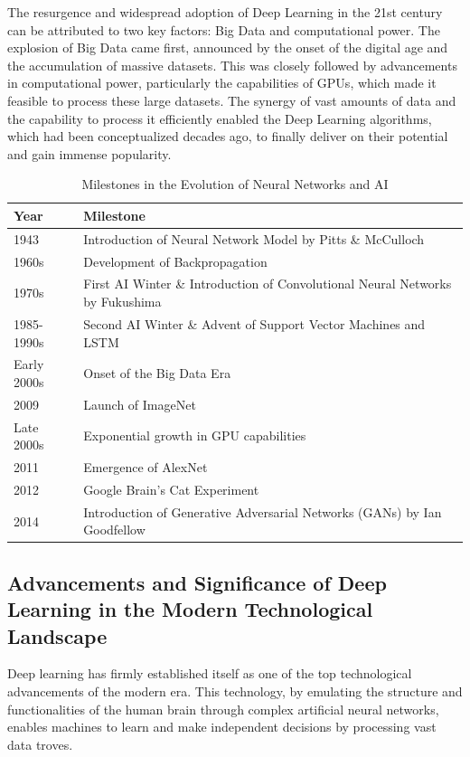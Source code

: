 The resurgence and widespread adoption of Deep Learning in the 21st century can be attributed to two key factors: Big Data and computational power. The explosion of Big Data came first, announced by the onset of the digital age and the accumulation of massive datasets. This was closely followed by advancements in computational power, particularly the capabilities of GPUs, which made it feasible to process these large datasets. The synergy of vast amounts of data and the capability to process it efficiently enabled the Deep Learning algorithms, which had been conceptualized decades ago, to finally deliver on their potential and gain immense popularity.\\

\begin{table}[htbp]
    \centering
    \caption{Milestones in the Evolution of Neural Networks and AI}
    \label{tab:milestones}
    \begin{tabular}{|l|p{\textwidth - 3cm}|}
        \hline
        \textbf{Year} & \textbf{Milestone} \\
        \hline
        1943 & Introduction of Neural Network Model by Pitts \& McCulloch \\
        \hline
        1960s & Development of Backpropagation \\
        \hline
        1970s & First AI Winter \& Introduction of Convolutional Neural Networks by Fukushima \\
        \hline
        1985-1990s & Second AI Winter \& Advent of Support Vector Machines and LSTM \\
        \hline
        Early 2000s & Onset of the Big Data Era \\
        \hline
        2009 & Launch of ImageNet \\
        \hline
        Late 2000s & Exponential growth in GPU capabilities \\
        \hline
        2011 & Emergence of AlexNet \\
        \hline
        2012 & Google Brain's Cat Experiment \\
        \hline
        2014 & Introduction of Generative Adversarial Networks (GANs) by Ian Goodfellow \\
        \hline
    \end{tabular}
\end{table}


\subsection{Advancements and Significance of Deep Learning in the Modern Technological Landscape}
Deep learning has firmly established itself as one of the top technological advancements of the modern era. 
This technology, by emulating the structure and functionalities of the human brain through complex artificial neural networks, enables machines to 
learn and make independent decisions by processing vast data troves.\\

